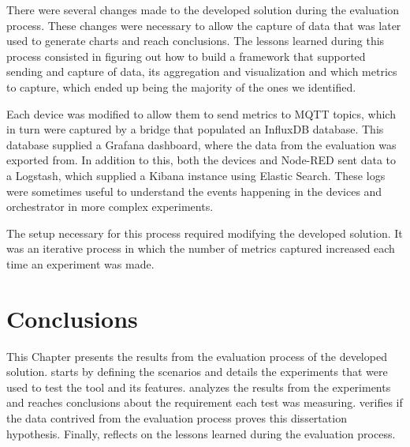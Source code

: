 There were several changes made to the developed solution during the evaluation process. These changes were necessary to allow the capture of data that was later used to generate charts and reach conclusions. The lessons learned during this process consisted in figuring out how to build a framework that supported sending and capture of data, its aggregation and visualization and which metrics to capture, which ended up being the majority of the ones we identified.

Each device was modified to allow them to send metrics to MQTT topics, which in turn were captured by a bridge that populated an InfluxDB database. This database supplied a Grafana dashboard, where the data from the evaluation was exported from. In addition to this, both the devices and Node-RED sent data to a Logstash, which supplied a Kibana instance using Elastic Search. These logs were sometimes useful to understand the events happening in the devices and orchestrator in more complex experiments.

The setup necessary for this process required modifying the developed solution. It was an iterative process in which the number of metrics captured increased each time an experiment was made.

\section{Conclusions}\label{sec:evaluation_conclusions}

This Chapter presents the results from the evaluation process of the developed solution.  starts by defining the scenarios and  details the experiments that were used to test the tool and its features.  analyzes the results from the experiments and reaches conclusions about the requirement each test was measuring.  verifies if the data contrived from the evaluation process proves this dissertation hypothesis. Finally,  reflects on the lessons learned during the evaluation process. 

